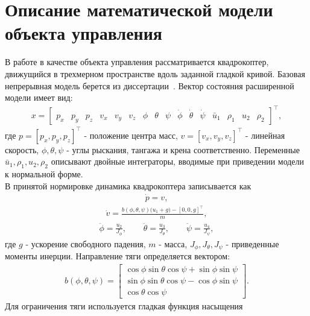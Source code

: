 \section{Описание математической модели объекта управления}

В работе в качестве объекта управления рассматривается квадрокоптер, движущийся в трехмерном пространстве вдоль заданной гладкой кривой.
Базовая непрерывная модель берется из диссертации~\cite{kim_algorithms}.
Вектор состояния расширенной модели имеет вид:
\begin{gather}
    x =
    \begin{bmatrix}
        p_x & p_y & p_z &
        v_x & v_y & v_z &
        \phi & \theta & \psi &
        \dot{\phi} & \dot{\theta} & \dot{\psi} &
        \bar{u}_1 & \rho_1 & u_2 & \rho_2
    \end{bmatrix}^{\top},
\end{gather}
где $p = [p_x, p_y, p_z]^{\top}$ - положение центра масс, $v = [v_x, v_y, v_z]^{\top}$ - линейная скорость, $\phi,\theta,\psi$ - углы рыскания, тангажа и крена соответственно. Переменные $\bar{u}_1,\rho_1,u_2,\rho_2$ описывают двойные интеграторы, вводимые при приведении модели к нормальной форме.\\
В принятой нормировке динамика квадрокоптера записывается как
\begin{gather}
    \dot{p} = v,
\end{gather}
\begin{gather}
    \dot{v} = \frac{b(\phi,\theta,\psi)\bigl(u_1 + g\bigr) - [0,0,g]^{\top}}{m},
\end{gather}
\begin{gather}
    \ddot{\phi} = \frac{u_2}{J_{\phi}}, \qquad
    \ddot{\theta} = \frac{u_3}{J_{\theta}}, \qquad
    \ddot{\psi} = \frac{u_4}{J_{\psi}},
\end{gather}
где $g$ - ускорение свободного падения, $m$ - масса, $J_{\phi},J_{\theta},J_{\psi}$ - приведенные моменты инерции. Направление тяги определяется вектором:
\begin{gather}
    b(\phi,\theta,\psi) =
    \begin{bmatrix}
        \cos\phi \sin\theta \cos\psi + \sin\phi \sin\psi \\
        \sin\phi \sin\theta \cos\psi - \cos\phi \sin\psi \\
        \cos\theta \cos\psi
    \end{bmatrix}.
\end{gather}
Для ограничения тяги используется гладкая функция насыщения
